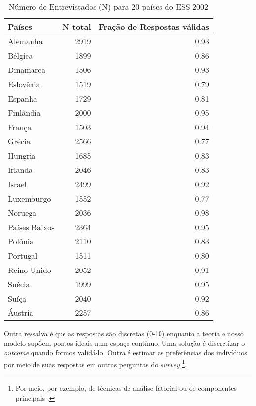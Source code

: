 \begin{table}[h]
  \centering
\label{my-label}
\begin{tabular}{|l|r|r|}
\hline
\textbf{Países} & \textbf{N total} & \textbf{Fração  de Respostas  válidas} \\ \hline
Alemanha        & 2919             & 0.93                           \\ \hline
Bélgica         & 1899             & 0.86                           \\ \hline
Dinamarca       & 1506             & 0.93                           \\ \hline
Eslovênia       & 1519             & 0.79                           \\ \hline
Espanha         & 1729             & 0.81                           \\ \hline
Finlândia       & 2000             & 0.95                           \\ \hline
França          & 1503             & 0.94                           \\ \hline
Grécia          & 2566             & 0.77                           \\ \hline
Hungria         & 1685             & 0.83                           \\ \hline
Irlanda         & 2046             & 0.83                           \\ \hline
Israel          & 2499             & 0.92                           \\ \hline
Luxemburgo      & 1552             & 0.77                           \\ \hline
Noruega         & 2036             & 0.98                           \\ \hline
Países Baixos   & 2364             & 0.95                           \\ \hline
Polônia         & 2110             & 0.83                           \\ \hline
Portugal        & 1511             & 0.80                           \\ \hline
Reino Unido     & 2052             & 0.91                           \\ \hline
Suécia          & 1999             & 0.95                           \\ \hline
Suíça           & 2040             & 0.92                           \\ \hline
Áustria         & 2257             & 0.86                           \\ \hline
\end{tabular}
\caption{Número de Entrevistados (N) para 20 países do ESS 2002}
\end{table}


Outra ressalva é que as respostas são discretas (0-10) enquanto a teoria e nosso
modelo supõem pontos ideais num espaço contínuo. Uma solução é discretizar o
\textit{outcome} quando formos validá-lo. Outra é estimar as preferências dos
indivíduos por meio de suas respostas em outras perguntas do \textit{survey}
\footnote{Por meio, por exemplo, de técnicas de análise fatorial ou de componentes
  principais \cite{laver2014measuring}.}.
